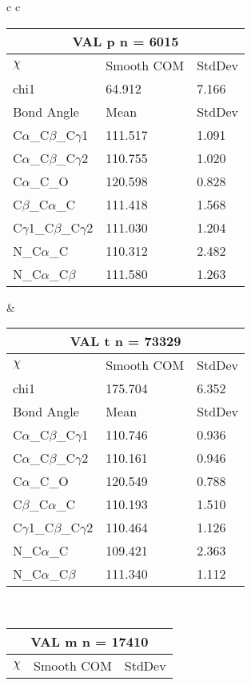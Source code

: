 \begin{longtable}{ c c }

  \begin{tabular}{ l l l }
  \toprule
  \multicolumn{3}{c}{VAL \textbf{p} n = 6015} \\ \toprule
  $\chi$       & Smooth COM & StdDev \\ \midrule
  chi1 & 64.912 & 7.166 \\ \midrule
  Bond Angle   & Mean     & StdDev \\ \midrule
  C$\alpha$\_C$\beta$\_C$\gamma$1 & 111.517 & 1.091\\
  C$\alpha$\_C$\beta$\_C$\gamma$2 & 110.755 & 1.020\\
  C$\alpha$\_C\_O & 120.598 & 0.828\\
  C$\beta$\_C$\alpha$\_C & 111.418 & 1.568\\
  C$\gamma$1\_C$\beta$\_C$\gamma$2 & 111.030 & 1.204\\
  N\_C$\alpha$\_C & 110.312 & 2.482\\
  N\_C$\alpha$\_C$\beta$ & 111.580 & 1.263\\
  \bottomrule
  \end{tabular}
  &
  \begin{tabular}{ l l l }
  \toprule
  \multicolumn{3}{c}{VAL \textbf{t} n = 73329} \\ \toprule
  $\chi$       & Smooth COM & StdDev \\ \midrule
  chi1 & 175.704 & 6.352 \\ \midrule
  Bond Angle   & Mean     & StdDev \\ \midrule
  C$\alpha$\_C$\beta$\_C$\gamma$1 & 110.746 & 0.936\\
  C$\alpha$\_C$\beta$\_C$\gamma$2 & 110.161 & 0.946\\
  C$\alpha$\_C\_O & 120.549 & 0.788\\
  C$\beta$\_C$\alpha$\_C & 110.193 & 1.510\\
  C$\gamma$1\_C$\beta$\_C$\gamma$2 & 110.464 & 1.126\\
  N\_C$\alpha$\_C & 109.421 & 2.363\\
  N\_C$\alpha$\_C$\beta$ & 111.340 & 1.112\\
  \bottomrule
  \end{tabular}
  \\
  \begin{tabular}{ l l l }
  \toprule
  \multicolumn{3}{c}{VAL \textbf{m} n = 17410} \\ \toprule
  $\chi$       & Smooth COM & StdDev \\ \midrule

\end{tabular}
\end{longtable}
